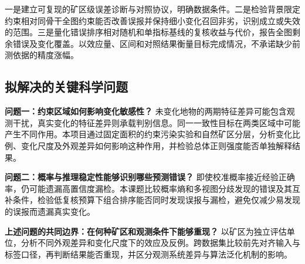 一是建立可复现的矿区级误差诊断与对照协议，明确数据条件。二是检验背景限定约束相对同骨干全图约束能否改善误报并保持细小变化召回非劣，识别成立或失效的范围。三是量化错误排序相对随机和单指标基线的复核收益与代价，报告全图剩余错误及变化覆盖。以效应量、区间和对照结果衡量目标完成情况，不承诺缺少前测依据的精度涨幅。

\subsection{拟解决的关键科学问题}
\textbf{问题一：约束区域如何影响变化敏感性？}
未变化地物的两期特征差异可能包含观测干扰，真实变化的特征差异则承载判别信息。同一一致性目标在两类区域中可能产生不同作用。本项目通过固定面积的约束污染实验和自然矿区分层，分析变化比例、变化尺度及外观差异如何影响这种作用，并检验总体正则强度能否单独解释结果。

\textbf{问题二：概率与推理稳定性能够识别哪些预测错误？}
即使校准概率接近经验正确率，仍可能遗漏高置信度漏检。本课题比较概率熵和多视图分歧发现的错误及其互补条件，检验低复核预算下组合排序能否同时发现误报与漏检，避免仅减少易发现的误报而遗漏真实变化。

\textbf{上述问题的共同边界：在何种矿区和观测条件下能够重现？}
以矿区为独立评估单位，分析不同外观差异和变化尺度下的效应及反例。跨数据集比较前先对齐输入与标签口径，再判断结果能否重现，并区分观测系统差异与算法泛化机制的影响。
